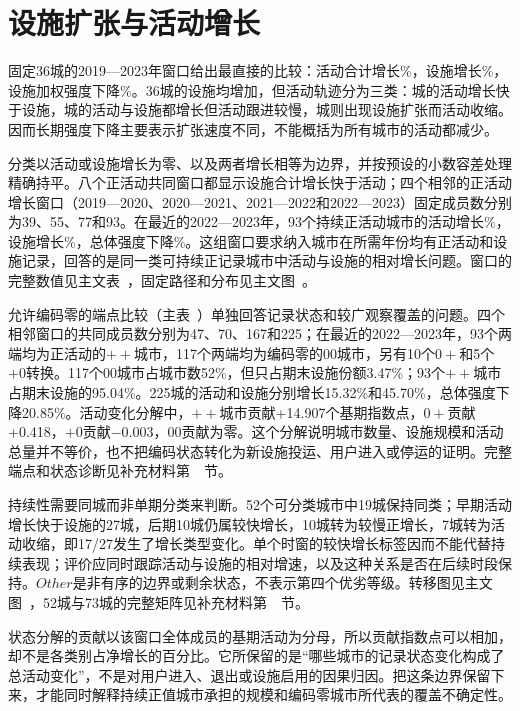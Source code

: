 \section*{设施扩张与活动增长}
固定36城的2019—2023年窗口给出最直接的比较：活动合计增长\AChange\%，设施增长\NChange\%，设施加权强度下降\IDecline\%。36城的设施均增加，但活动轨迹分为三类：\LongFast{}城的活动增长快于设施，\LongSlow{}城的活动与设施都增长但活动跟进较慢，\LongContract{}城则出现设施扩张而活动收缩。因而长期强度下降主要表示扩张速度不同，不能概括为所有城市的活动都减少。

分类以活动或设施增长为零、以及两者增长相等为边界，并按预设的小数容差处理精确持平。八个正活动共同窗口都显示设施合计增长快于活动；四个相邻的正活动增长窗口（2019—2020、2020—2021、2021—2022和2022—2023）固定成员数分别为39、55、77和93。在最近的2022—2023年，93个持续正活动城市的活动增长\RecentA\%，设施增长\RecentN\%，总体强度下降\RecentIDecline\%。这组窗口要求纳入城市在所需年份均有正活动和设施记录，回答的是同一类可持续正记录城市中活动与设施的相对增长问题。窗口的完整数值见主文表~，固定路径和分布见主文图~。

允许编码零的端点比较（主表~）单独回答记录状态和较广观察覆盖的问题。四个相邻窗口的共同成员数分别为47、70、167和225；在最近的2022—2023年，93个两端均为正活动的$++$城市，117个两端均为编码零的$00$城市，另有10个$0+$和5个$+0$转换。117个$00$城市占城市数52\%，但只占期末设施份额3.47\%；93个$++$城市占期末设施的95.04\%。225城的活动和设施分别增长15.32\%和45.70\%，总体强度下降20.85\%。活动变化分解中，$++$城市贡献+14.907个基期指数点，$0+$贡献+0.418，$+0$贡献$-0.003$，$00$贡献为零。这个分解说明城市数量、设施规模和活动总量并不等价，也不把编码状态转化为新设施投运、用户进入或停运的证明。完整端点和状态诊断见补充材料第~~节。

持续性需要同城而非单期分类来判断。52个可分类城市中19城保持同类；早期活动增长快于设施的27城，后期10城仍属较快增长，10城转为较慢正增长，7城转为活动收缩，即17/27发生了增长类型变化。单个时窗的较快增长标签因而不能代替持续表现；评价应同时跟踪活动与设施的相对增速，以及这种关系是否在后续时段保持。$Other$是非有序的边界或剩余状态，不表示第四个优劣等级。转移图见主文图~，52城与73城的完整矩阵见补充材料第~~节。

状态分解的贡献以该窗口全体成员的基期活动为分母，所以贡献指数点可以相加，却不是各类别占净增长的百分比。它所保留的是“哪些城市的记录状态变化构成了总活动变化”，不是对用户进入、退出或设施启用的因果归因。把这条边界保留下来，才能同时解释持续正值城市承担的规模和编码零城市所代表的覆盖不确定性。

